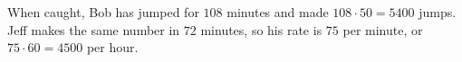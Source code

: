 When caught, Bob has jumped for $108$ minutes and made $108\cdot50=5400$ jumps. Jeff makes the same number in $72$ minutes, so his rate is $75$ per minute, or $75\cdot60=\boxed{4500}$ per hour.
